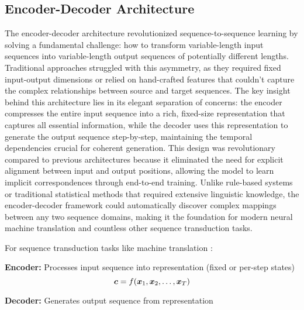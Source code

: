 
\subsection{Encoder-Decoder Architecture}

The encoder-decoder architecture revolutionized sequence-to-sequence learning by solving a fundamental challenge: how to transform variable-length input sequences into variable-length output sequences of potentially different lengths. Traditional approaches struggled with this asymmetry, as they required fixed input-output dimensions or relied on hand-crafted features that couldn't capture the complex relationships between source and target sequences. The key insight behind this architecture lies in its elegant separation of concerns: the encoder compresses the entire input sequence into a rich, fixed-size representation that captures all essential information, while the decoder uses this representation to generate the output sequence step-by-step, maintaining the temporal dependencies crucial for coherent generation. This design was revolutionary compared to previous architectures because it eliminated the need for explicit alignment between input and output positions, allowing the model to learn implicit correspondences through end-to-end training. Unlike rule-based systems or traditional statistical methods that required extensive linguistic knowledge, the encoder-decoder framework could automatically discover complex mappings between any two sequence domains, making it the foundation for modern neural machine translation and countless other sequence transduction tasks.

For sequence transduction tasks like machine translation \cite{Cho2014,Bahdanau2014}:

\textbf{Encoder:} Processes input sequence into representation (fixed or per-step states)
\begin{equation}
\boldsymbol{c} = f(\boldsymbol{x}_1, \boldsymbol{x}_2, \ldots, \boldsymbol{x}_T)
\end{equation}

\textbf{Decoder:} Generates output sequence from representation
